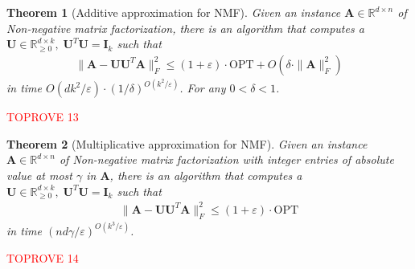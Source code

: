 \documentclass[11pt]{article}
\makeatletter
\theoremstyle{plain}
\newtheorem{theorem}{Theorem}[section]
\theoremstyle{plain}
\theoremstyle{definition}
\theoremstyle{plain}
\theoremstyle{remark}
\newenvironment{proof}[1][\protect\proofname]{\par
	\normalfont\topsep6\p@\@plus6\p@\relax
	\trivlist
	\itemindent\parindent
	\item[\hskip\labelsep\scshape #1]\ignorespaces
}{\endtrivlist\@endpefalse
}
\providecommand{\proofname}{Proof}
\newcommand{\RR}{\mathbb{R}}
\newcommand{\opt}{\ensuremath{\text{OPT}}\xspace}
\makeatother
\begin{document}
\begin{theorem}[Additive approximation for NMF] \label{thm:NMF-additive}
Given an instance $\bm{A}\in \RR^{d\times n}$ of Non-negative matrix factorization, there is an algorithm that computes a $\bm{U}\in \RR^{d\times k}_{\geq 0}, \; \bm{U}^T\bm{U}=\bm{I}_k$ such that 
\begin{align*}
    \|\bm{A}-\bm{U}\bm{U}^T\bm{A}\|_F^2 \leq (1+\varepsilon)\cdot \opt + O(\delta\cdot \|\bm{A}\|_F^2)
\end{align*}
in time $O(dk^2/\varepsilon)\cdot (1/
\delta)^{O(k^2/\varepsilon)}$. For any $0<\delta<1$. 
\end{theorem}
\begin{proof}\textcolor{red}{TOPROVE 13}\end{proof}


\begin{theorem}[Multiplicative approximation for NMF]\label{thm:NMF-multiplicative}
Given an instance $\bm{A}\in \RR^{d\times n}$ of Non-negative matrix factorization with integer entries of absolute value at most $\gamma$ in $\bm{A}$, there is an algorithm that computes a $\bm{U}\in \RR^{d\times k}_{\geq 0}, \; \bm{U}^T\bm{U}=\bm{I}_k$ such that 
\begin{align*}
    \|\bm{A}-\bm{U}\bm{U}^T\bm{A}\|_F^2 \leq (1+\varepsilon)\cdot \opt 
\end{align*}
in time $(nd\gamma/\varepsilon)^{O(k^3/\varepsilon)}$. 
\end{theorem}
\begin{proof}\textcolor{red}{TOPROVE 14}\end{proof}
\end{document}
